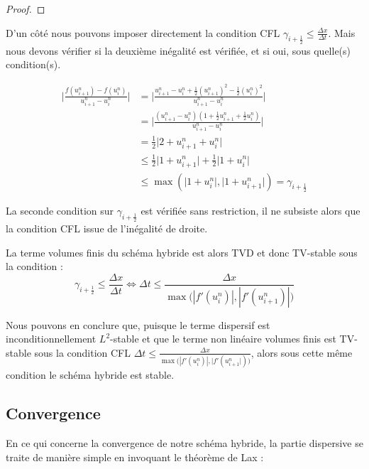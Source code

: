 \begin{proof}
    
\end{proof}

D'un côté nous pouvons imposer directement la condition CFL $\gamma_{i+\frac{1}{2}} \leq \frac{\Delta x}{\Delta t}$. Mais nous devons vérifier si la deuxième inégalité est vérifiée, et si oui, sous quelle(s) condition(s).

\begin{equation*}
\begin{split}
    \Bigg| \frac{f(u_{i+1}^n) - f(u_i^n)}{u_{i+1}^n - u_i^n} \Bigg| &= \Bigg| \frac{u_{i+1}^n - u_i^n + \frac{1}{2}(u_{i+1}^n)^2 - \frac{1}{2}(u_i^n)^2}{u_{i+1}^n - u_i^n} \Bigg| \\
    &= \Bigg| \frac{(u_{i+1}^n - u_i^n)( 1 + \frac{1}{2}u_{i+1}^n + \frac{1}{2}u_i^n)}{u_{i+1}^n - u_i^n} \Bigg| \\
    &= \frac{1}{2} \big| 2 + u_{i+1}^n + u_i^n \big| \\
    &\leq \frac{1}{2}\big| 1 + u_{i+1}^n \big| + \frac{1}{2}\big| 1 + u_{i}^n \big|\\
    &\leq \max(\big| 1 + u_{i}^n \big|,\big| 1 + u_{i+1}^n \big|) = \gamma_{i+\frac{1}{2}}
\end{split}
\end{equation*}

La seconde condition sur $\gamma_{i+\frac{1}{2}}$ est vérifiée sans restriction, il ne subsiste alors que la condition CFL issue de l'inégalité de droite.

La terme volumes finis du schéma hybride est alors TVD et donc TV-stable sous la condition :
$$\gamma_{i+\frac{1}{2}} \leq \frac{\Delta x}{\Delta t} \Leftrightarrow \Delta t \leq \frac{\Delta x}{\max\big(|f'(u_{i}^n)|,|f'(u_{i+1}^n)|\big)}$$

\vspace{1em}

Nous pouvons en conclure que, puisque le terme dispersif est inconditionnellement $L^2$-stable et que le terme non linéaire volumes finis est TV-stable sous la condition CFL $\Delta t \leq \frac{\Delta x}{\max\big(|f'(u_{i}^n)|,|f'(u_{i+1}^n|)\big)}$, alors sous cette même condition le schéma hybride est stable.

\subsection{Convergence}


En ce qui concerne la convergence de notre schéma hybride, la partie dispersive se traite de manière simple en invoquant le théorème de Lax :


